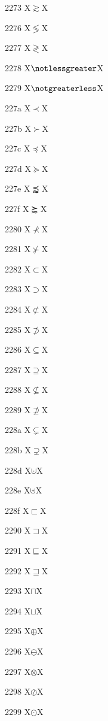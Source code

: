 \documentclass[11pt]{article}
\begin{document}
2273 X{\ensuremath{\gtrsim}}X

2276 X{\ensuremath{\lessgtr}}X

2277 X{\ensuremath{\gtrless}}X

2278 X{\ensuremath{\notlessgreater}}X

2279 X{\ensuremath{\notgreaterless}}X

227a X{\ensuremath{\prec}}X

227b X{\ensuremath{\succ}}X

227c X{\ensuremath{\preccurlyeq}}X

227d X{\ensuremath{\succcurlyeq}}X

227e X{\ensuremath{\precapprox}}X

227f X{\ensuremath{\succapprox}}X

2280 X{\ensuremath{\nprec}}X

2281 X{\ensuremath{\nsucc}}X

2282 X{\ensuremath{\subset}}X

2283 X{\ensuremath{\supset}}X

2284 X{\ensuremath{\nsubset}}X

2285 X{\ensuremath{\nsupset}}X

2286 X{\ensuremath{\subseteq}}X

2287 X{\ensuremath{\supseteq}}X

2288 X{\ensuremath{\nsubseteq}}X

2289 X{\ensuremath{\nsupseteq}}X

228a X{\ensuremath{\subsetneq}}X

228b X{\ensuremath{\supsetneq}}X

228d X{\ensuremath{\cupdot}}X

228e X{\ensuremath{\uplus}}X

228f X{\ensuremath{\sqsubset}}X

2290 X{\ensuremath{\sqsupset}}X

2291 X{\ensuremath{\sqsubseteq}}X

2292 X{\ensuremath{\sqsupseteq}}X

2293 X{\ensuremath{\sqcap}}X

2294 X{\ensuremath{\sqcup}}X

2295 X{\ensuremath{\oplus}}X

2296 X{\ensuremath{\ominus}}X

2297 X{\ensuremath{\otimes}}X

2298 X{\ensuremath{\oslash}}X

2299 X{\ensuremath{\odot}}X
\end{document}
